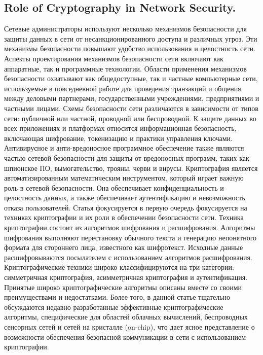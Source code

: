 \documentclass[14pt]{extarticle}
\begin{document}
\subsection{Role of Cryptography in Network Security.\cite{Article6}}

 Сетевые администраторы используют несколько механизмов безопасности для защиты данных в сети от несанкционированного доступа и различных угроз. Эти механизмы безопасности повышают удобство использования и целостность сети. Аспекты проектирования механизмов безопасности сети включают как аппаратные, так и программные технологии. Области применения механизмов безопасности охватывают как общедоступные, так и частные компьютерные сети, используемые в повседневной работе для проведения транзакций и общения между деловыми партнерами, государственными учреждениями, предприятиями и частными лицами. Схемы безопасности сети различаются в зависимости от типов сети: публичной или частной, проводной или беспроводной. К защите данных во всех приложениях и платформах относится информационная безопасность, включающая шифрование, токенизацию и практики управления ключами. Антивирусное и анти-вредоносное программное обеспечение также являются частью сетевой безопасности для защиты от вредоносных программ, таких как шпионское ПО, вымогательство, трояны, черви и вирусы. Криптография является автоматизированным математическим инструментом, который играет важную роль в сетевой безопасности. Она обеспечивает конфиденциальность и целостность данных, а также обеспечивает аутентификацию и невозможность отказа пользователей. Статья фокусируется в первую очередь фокусируется на техниках криптографии и их роли в обеспечении безопасности сети. Техника криптографии состоит из алгоритмов шифрования и расшифрования. Алгоритмы шифрования выполняют перестановку обычного текста и генерацию непонятного формата для стороннего лица, известного как шифротекст. Исходные данные расшифровываются посылателем с использованием алгоритмов расшифрования. Криптографические техники широко классифицируются на три категории: симметричная криптография, асимметричная криптография и аутентификация. Принятые широко криптографические алгоритмы описаны вместе со своими преимуществами и недостатками. Более того, в данной статье тщательно обсуждаются недавно разработанные эффективные криптографические алгоритмы, специфические для областей облачных вычислений, беспроводных сенсорных сетей и сетей на кристалле (on-chip), что дает ясное представление о возможности обеспечения безопасной коммуникации в сети с использованием криптографии.
\end{document}
